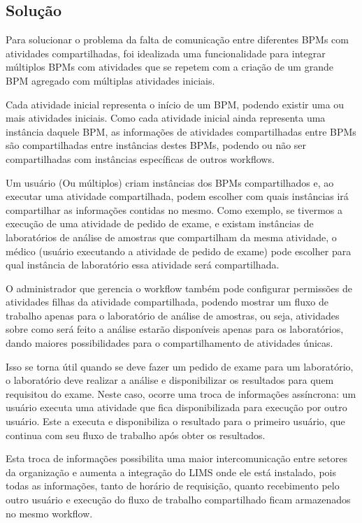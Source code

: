 \subsection{Solução}

Para solucionar o problema da falta de comunicação entre diferentes BPMs com atividades compartilhadas, foi idealizada uma funcionalidade para integrar múltiplos BPMs com atividades que se repetem com a criação de um grande BPM agregado com múltiplas atividades iniciais.

Cada atividade inicial representa o início de um BPM, podendo existir uma ou mais atividades iniciais.
Como cada atividade inicial ainda representa uma instância daquele BPM, as informações de atividades compartilhadas entre BPMs são compartilhadas entre instâncias destes BPMs, podendo ou não ser compartilhadas com instâncias específicas de outros workflows.

Um usuário (Ou múltiplos) criam instâncias dos BPMs compartilhados e, ao executar uma atividade compartilhada, podem escolher com quais instâncias irá compartilhar as informações contidas no mesmo.
Como exemplo, se tivermos a execução de uma atividade de pedido de exame, e existam instâncias de laboratórios de análise de amostras que compartilham da mesma atividade, o médico (usuário executando a atividade de pedido de exame) pode escolher para qual instância de laboratório essa atividade será compartilhada.

O administrador que gerencia o workflow também pode configurar permissões de atividades filhas da atividade compartilhada, podendo mostrar um fluxo de trabalho apenas para o laboratório de análise de amostras, ou seja, atividades sobre como será feito a análise estarão disponíveis apenas para os laboratórios, dando maiores possibilidades para o compartilhamento de atividades únicas.

Isso se torna útil quando se deve fazer um pedido de exame para um laboratório, o laboratório deve realizar a análise e disponibilizar os resultados para quem requisitou do exame. Neste caso, ocorre uma troca de informações assíncrona: um usuário executa uma atividade que fica disponibilizada para execução por outro usuário. Este a executa e disponibiliza o resultado para o primeiro usuário, que continua com seu fluxo de trabalho após obter os resultados.

Esta troca de informações possibilita uma maior intercomunicação entre setores da organização e aumenta a integração do LIMS onde ele está instalado, pois todas as informações, tanto de horário de requisição, quanto recebimento pelo outro usuário e execução do fluxo de trabalho compartilhado ficam armazenados no mesmo workflow.